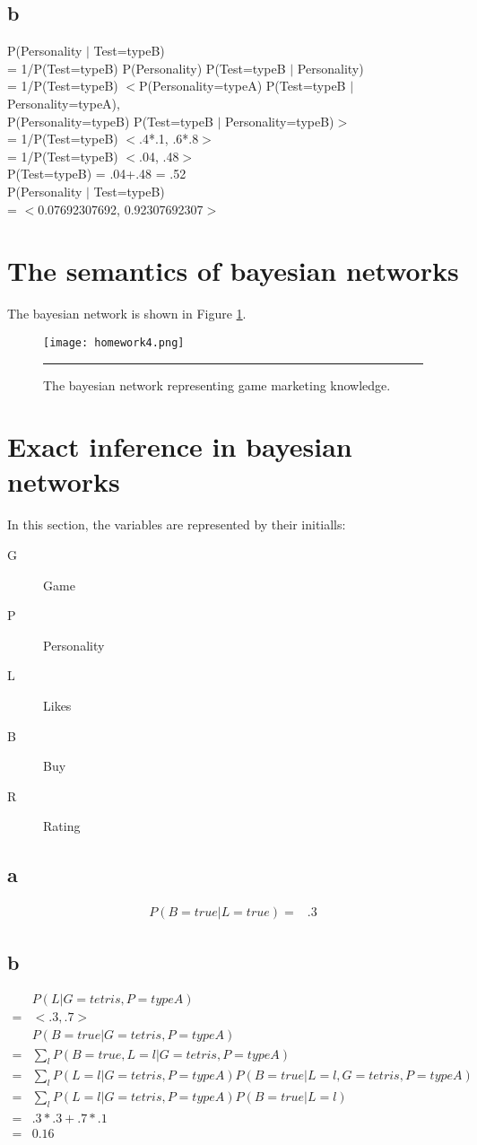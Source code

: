 \documentclass[12pt]{article}
\begin{document}
\subsection{b}
P(Personality $|$ Test=typeB)\\
= 1/P(Test=typeB) P(Personality) P(Test=typeB $|$ Personality)\\
= 1/P(Test=typeB) $<$P(Personality=typeA) P(Test=typeB $|$ Personality=typeA),\\
P(Personality=typeB) P(Test=typeB $|$ Personality=typeB)$>$\\
= 1/P(Test=typeB) $<$.4*.1, .6*.8$>$\\
= 1/P(Test=typeB) $<$.04, .48$>$\\
P(Test=typeB) = .04+.48 = .52\\
P(Personality $|$ Test=typeB)\\
= $<$0.07692307692, 0.92307692307$>$

\section{The semantics of bayesian networks}
The bayesian network is shown in Figure \ref{fig:game}.
\begin{figure}
  \centering
      {\texttt{[image: homework4.png]}} \rule{1\linewidth}{1pt}
      \caption{The bayesian network representing game marketing knowledge.}
      \label{fig:game}
\end{figure}

\section{Exact inference in bayesian networks}
In this section, the variables are represented by their initialls:
\begin{description}
  \item[G] Game
  \item[P] Personality
  \item[L] Likes
  \item[B] Buy
  \item[R] Rating
\end{description}
\subsection{a}
\begin{align*}
  P(B=true|L=true)
  =& .3
\end{align*}
\subsection{b}
\begin{align*}
  &P(L|G=tetris,P=typeA)\\
  =& <.3,.7> \\
  & P(B=true|G=tetris,P=typeA)\\
  =& \sum_l P(B=true,L=l|G=tetris,P=typeA)\\
  =& \sum_l P(L=l|G=tetris,P=typeA) P(B=true|L=l,G=tetris,P=typeA)\\
  =& \sum_l P(L=l|G=tetris,P=typeA) P(B=true|L=l)\\
  =& .3*.3+.7*.1\\
  =& 0.16
\end{align*}
\end{document}
